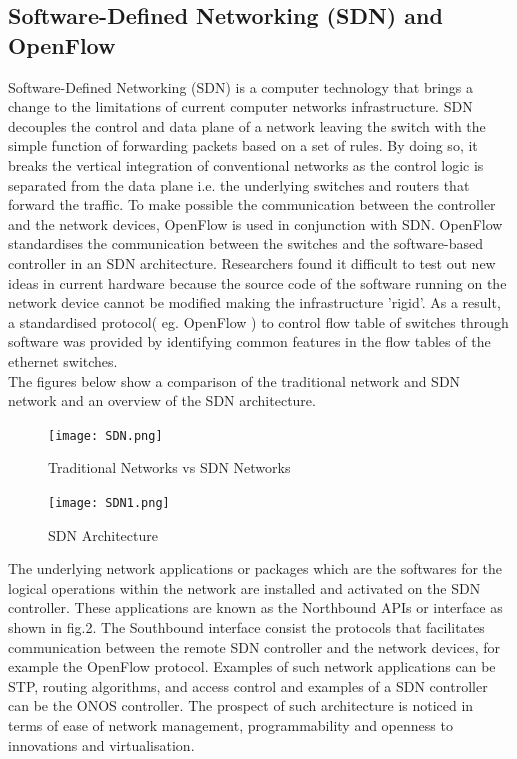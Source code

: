 \documentclass{article}
\begin{document}
\subsection{Software-Defined Networking (SDN) and OpenFlow} 
Software-Defined Networking (SDN) is a computer technology that brings a change to the limitations of current computer networks infrastructure. SDN\cite{6587999} decouples the control and data plane of a network leaving the switch with the simple function of forwarding packets based on a set of rules. By doing so, it breaks the vertical integration of conventional networks as the control logic is separated from the data plane i.e. the underlying switches and routers that forward the traffic\cite{6994333}. To make possible the communication between the controller and the network devices, OpenFlow\cite{6587999} is used in conjunction with SDN. OpenFlow standardises the communication between the switches and the software-based controller in an SDN architecture. Researchers found it difficult to test out new ideas in current hardware because the source code of the software running on the network device cannot be modified making the infrastructure 'rigid'. As a result, a standardised protocol( eg. OpenFlow ) to control flow table of switches through software was provided by identifying common features in the flow tables of the ethernet switches\cite{6587999}.\\The figures below show a comparison of the traditional network and SDN network and an overview of the SDN architecture.\\
	\begin{figure}[h]
        		\centering
        		\texttt{[image: SDN.png]}
        		\caption{Traditional Networks vs SDN Networks}
        		\label{fig:SDN1}
	\end{figure}
    
	\newpage
    	\begin{figure}[h]
        		\centering
        		\texttt{[image: SDN1.png]}
        		\caption{SDN Architecture}
       		 \label{fig:SDN2}
    	\end{figure} 
The underlying network applications or packages which are the softwares for the logical operations within the network are installed and activated on the SDN controller. These applications are known as the Northbound APIs or interface as shown in fig.2. The Southbound interface consist the protocols that facilitates communication between the remote SDN controller and the network devices, for example the OpenFlow\cite{10220519} protocol. Examples of such network applications can be STP, routing algorithms, and access control and examples of a SDN controller can be the ONOS controller. The prospect of such architecture is noticed in terms of ease of network management, programmability and openness to innovations and virtualisation.
\end{document}
